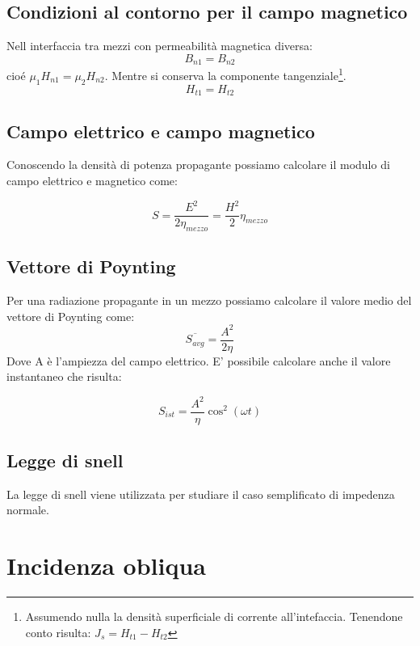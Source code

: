 \documentclass[10pt,a4paper]{report}
\begin{document}
	\section{Condizioni al contorno per il campo magnetico}
		Nell interfaccia tra mezzi con permeabilità magnetica diversa:
		\begin{equation}
		B_{n1}=B_{n2} 
		\end{equation}
		cioé $\mu_1 H_{n1} = \mu_2 H_{n2}$.
		Mentre si conserva la componente tangenziale\footnote{Assumendo nulla la densità superficiale di corrente all'intefaccia. Tenendone conto risulta: $J_s=H_{t1}-H_{t2}$}.
		\begin{equation}
		H_{t1}=H_{t2}
		\end{equation}

	\section{Campo elettrico e campo magnetico}

	Conoscendo la densità di potenza propagante possiamo calcolare il modulo di campo elettrico e magnetico come:

	\[
	S=\frac{E^2}{2\eta_{mezzo}}=\frac{H^2}{2}\eta_{mezzo}
	\]

	\section{Vettore di Poynting}
		Per una radiazione propagante in un mezzo possiamo calcolare il valore medio del vettore di Poynting come:
		\begin{equation}
		\overline{S_{avg}}=\frac{A^2}{2\eta}
		\end{equation}
		Dove A è l'ampiezza del campo elettrico.
		E' possibile calcolare anche il valore instantaneo che risulta:

		\begin{equation}
		S_{ist}=\frac{A^2}{\eta}\cos^2(\omega t)
		\end{equation}
	
	\section{Legge di snell}

	La legge di snell viene utilizzata per studiare il caso semplificato di impedenza normale.


\chapter{Incidenza obliqua}
\end{document}
